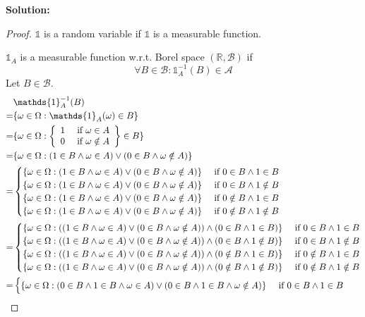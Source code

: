 \documentclass{article}
\begin{document}
\textbf{Solution:}
\begin{proof}
\(\mathds{1}\) is a random variable if \(\mathds{1}\) is a measurable function.

\(\mathds{1}_A\) is a measurable function w.r.t. Borel space \((\mathbb{R}, \mathcal{B})\) if
\[\forall B \in \mathcal{B}: \mathds{1}_A^{-1}(B)\in \mathcal{A}\]
Let \(B \in \mathcal{B}\).
\begin{align*}
     & \mathds{1}^{-1}_A(B) \\
    =& \{\omega\in\Omega:\mathds{1}_A(\omega)\in B\} \\
    =& \{\omega\in\Omega:\casesiie{1}{\omega\in A}{0}{\omega\notin A}\in B\} \\
    =& \{\omega\in\Omega:(1\in B\wedge \omega\in A)\vee (0\in B\wedge \omega \notin A)\} \\
    =& \begin{cases}
    \{\omega\in\Omega:(1\in B\wedge \omega\in A)\vee (0\in B\wedge \omega \notin A)\}&\text{ if }0\in B\wedge 1\in B\\
    \{\omega\in\Omega:(1\in B\wedge \omega\in A)\vee (0\in B\wedge \omega \notin A)\}&\text{ if }0\in B\wedge 1\notin B\\
    \{\omega\in\Omega:(1\in B\wedge \omega\in A)\vee (0\in B\wedge \omega \notin A)\}&\text{ if }0\notin B\wedge 1\in B\\
    \{\omega\in\Omega:(1\in B\wedge \omega\in A)\vee (0\in B\wedge \omega \notin A)\}&\text{ if }0\notin B\wedge 1\notin B
    \end{cases} \\
    =& \begin{cases}
    \{\omega\in\Omega:((1\in B\wedge \omega\in A)\vee (0\in B\wedge \omega \notin A))\wedge (0\in B\wedge 1\in B)\}&\text{ if }0\in B\wedge 1\in B\\
    \{\omega\in\Omega:((1\in B\wedge \omega\in A)\vee (0\in B\wedge \omega \notin A))\wedge (0\in B\wedge 1\notin B)\}&\text{ if }0\in B\wedge 1\notin B\\
    \{\omega\in\Omega:((1\in B\wedge \omega\in A)\vee (0\in B\wedge \omega \notin A))\wedge (0\notin B\wedge 1\in B)\}&\text{ if }0\notin B\wedge 1\in B\\
    \{\omega\in\Omega:((1\in B\wedge \omega\in A)\vee (0\in B\wedge \omega \notin A))\wedge (0\notin B\wedge 1\notin B)\}&\text{ if }0\notin B\wedge 1\notin B
    \end{cases} \\
    =& \begin{cases}
    \{\omega\in\Omega:(0\in B \wedge 1\in B\wedge \omega\in A)\vee (0\in B\wedge 1\in B\wedge \omega \notin A)\}&\text{ if }0\in B\wedge 1\in B\\

\end{cases}
\end{align*}
\end{proof}
\end{document}
